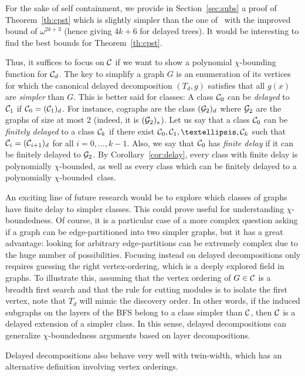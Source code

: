 \documentclass[11pt]{article}
\numberwithin{equation}{section}
\newcommand{\pcb}{polynomially $\chi$-bounded}
\begin{document}
For the sake of self containment, we  provide in Section~\ref{sec:subs} a proof of Theorem~\ref{th:cpst} which is slightly simpler than the one of~\cite{CPST13} with the improved bound of $\omega^{2k+3}$ (hence giving $4k+6$ for delayed trees). It would be interesting to find the best bounds for Theorem~\ref{th:cpst}.

Thus, it suffices to focus on $\cal C$ if we want to show a polynomial $\chi$-bounding function for ${\cal C}_d$. The key to simplify a graph $G$ is an enumeration of its vertices for which the canonical delayed decomposition $(T_d,g)$ satisfies that all $g(x)$ are \emph{simpler} than $G$. This is better said for classes: A class ${\cal C}_0$ can be \emph{delayed} to ${\cal C}_1$ if ${\cal C}_0=({{\cal C}_1})_d$. For instance, cographs are the class $({{\cal G}_2})_d$ where ${\cal G}_2$ are the graphs of size at most 2 (indeed, it is $({{\cal G}_2})_s$). Let us say that a class ${\cal C}_0$ can be \emph{finitely delayed} to a class ${\cal C}_k$ if there exist ${\cal C}_0, {\cal C}_1,\dots ,{\cal C}_k$ such that ${\cal C}_i=({{\cal C}_{i+1}})_d$ for all $i=0,\dots ,k-1$. Also, we say that ${\cal C}_0$ has \emph{finite delay} if it can be finitely delayed to ${\cal G}_2$. By Corollary~\ref{cor:delay}, every class with finite delay is \pcb, as well as every class which can be finitely delayed to a \pcb~class. 

An exciting line of future research would be to explore which classes of graphs have finite delay to simpler classes. This could prove useful for understanding $\chi$-boundedness. Of course, it is a particular case of a more complex question asking if a graph can be edge-partitioned into two simpler graphs, but it has a great advantage: looking for arbitrary edge-partitions can be extremely complex due to the huge number of possibilities. Focusing instead on delayed decompositions only requires guessing the right vertex-ordering, which is a deeply explored field in graphs. To illustrate this, assuming that the vertex ordering of $G\in \cal C$ is a breadth first search and that the rule for cutting modules is to isolate the first vertex, note that $T_d$ will mimic the discovery order. In other words, if the induced subgraphs on the layers of the BFS belong to a  class simpler than $\cal C$, then $\cal C$ is a delayed extension of a simpler class. In this sense, delayed decompositions can generalize $\chi$-boundedness arguments based on layer decompositions.



Delayed decompositions also behave very well with twin-width, which has an alternative definition involving vertex orderings.
\end{document}
